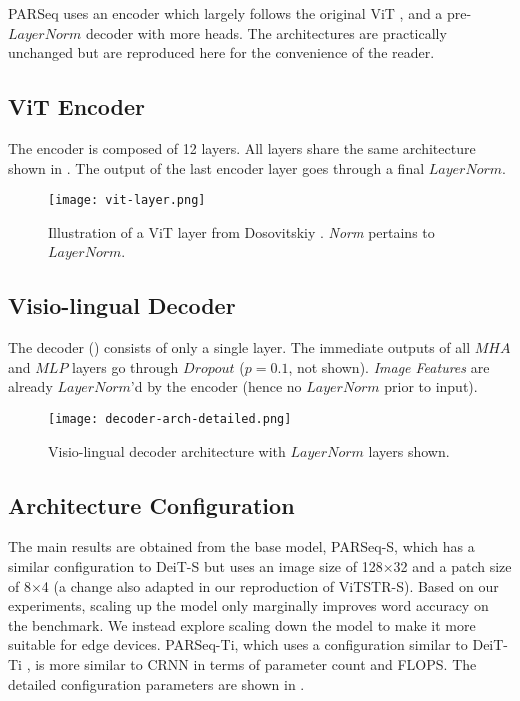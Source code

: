PARSeq uses an encoder which largely follows the original ViT \cite{dosovitskiy2020image}, and a pre-$LayerNorm$ \cite{baevski2018adaptive,wang2019learning} decoder with more heads. The architectures are practically unchanged but are reproduced here for the convenience of the reader.

\subsection{ViT Encoder}

The encoder is composed of 12 layers. All layers share the same architecture shown in . The output of the last encoder layer goes through a final $LayerNorm$.

\begin{figure}[ht]
  \centering
  \texttt{[image: vit-layer.png]}
   \caption[Illustration of a ViT layer.]{Illustration of a ViT layer from Dosovitskiy \etal \cite{dosovitskiy2020image}. \textit{Norm} pertains to $LayerNorm$.}
   \label{fig:vit-arch}
\end{figure}

\subsection{Visio-lingual Decoder}

The decoder () consists of only a single layer. The immediate outputs of all $MHA$ and $MLP$ layers go through $Dropout$ ($p = 0.1$, not shown). \textit{Image Features} are already $LayerNorm$'d by the encoder (hence no $LayerNorm$ prior to input).

\begin{figure}[ht]
  \centering  \texttt{[image: decoder-arch-detailed.png]}
   \caption{Visio-lingual decoder architecture with $LayerNorm$ layers shown.}
   \label{fig:decoder-arch-detailed}
\end{figure}

\subsection{Architecture Configuration}
\label{sec:arch-config}

The main results are obtained from the base model, PARSeq-S, which has a similar configuration to DeiT-S \cite{touvron2021training} but uses an image size of 128$\times$32 and a patch size of 8$\times$4 (a change also adapted in our reproduction of ViTSTR-S). Based on our experiments, scaling up the model only marginally improves word accuracy on the benchmark. We instead explore scaling down the model to make it more suitable for edge devices. PARSeq-Ti, which uses a configuration similar to DeiT-Ti \cite{touvron2021training}, is more similar to CRNN \cite{shi2016end} in terms of parameter count and FLOPS. The detailed configuration parameters are shown in .

